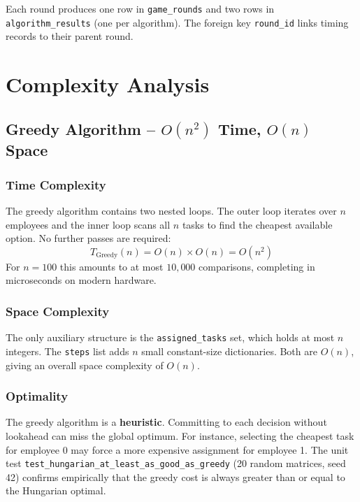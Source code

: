\documentclass[12pt,a4paper]{article}
\begin{document}
\noindent
Each round produces one row in \texttt{game\_rounds} and two rows in
\texttt{algorithm\_results} (one per algorithm). The foreign key
\texttt{round\_id} links timing records to their parent round.

\clearpage
\section{Complexity Analysis}

\subsection{Greedy Algorithm -- $O(n^2)$ Time, $O(n)$ Space}

\subsubsection{Time Complexity}

The greedy algorithm contains two nested loops. The outer loop iterates over $n$
employees and the inner loop scans all $n$ tasks to find the cheapest available
option. No further passes are required:
\[
    T_{\text{Greedy}}(n) = O(n) \times O(n) = O(n^2)
\]
For $n = 100$ this amounts to at most $10{,}000$ comparisons, completing in
microseconds on modern hardware.

\subsubsection{Space Complexity}

The only auxiliary structure is the \texttt{assigned\_tasks} set, which holds at
most $n$ integers. The \texttt{steps} list adds $n$ small constant-size dictionaries.
Both are $O(n)$, giving an overall space complexity of $O(n)$.

\subsubsection{Optimality}

The greedy algorithm is a \textbf{heuristic}. Committing to each decision without
lookahead can miss the global optimum. For instance, selecting the cheapest task
for employee 0 may force a more expensive assignment for employee 1. The unit test
\texttt{test\_hungarian\_at\_least\_as\_good\_as\_greedy} (20 random matrices,
seed 42) confirms empirically that the greedy cost is always greater than or equal
to the Hungarian optimal.
\end{document}
